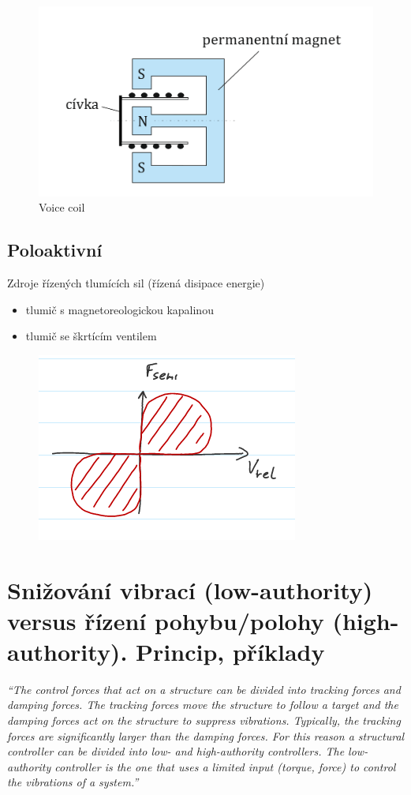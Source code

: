 \documentclass{article}
\begin{document}
	\begin{figure}[h!]
		\centering
		\includegraphics[width=0.5\linewidth]{figs/VoiceCoil.png}
		\caption{Voice coil}
	\end{figure}

	\subsection{Poloaktivní}
	Zdroje řízených tlumících sil (řízená disipace energie)
	\begin{itemize}
	\item tlumič s magnetoreologickou kapalinou
	\item tlumič se škrtícím ventilem
	\end{itemize}

	\begin{figure}[h!]
		\centering
		\includegraphics{figs/PoloAktivniAktuator.png}
	\end{figure}

	\section{Snižování vibrací (low-authority) versus řízení pohybu/polohy (high-authority). Princip, příklady}
	
	\emph{``The control forces that act on a structure can be divided into tracking forces and damping forces. The tracking forces move the structure to follow a target and the damping forces act on the structure to suppress vibrations. Typically, the tracking forces are significantly larger than the damping forces. For this reason a structural controller can be divided into low- and high-authority controllers. The low-authority controller is the one that uses a limited input (torque, force) to control the vibrations of a system.''}
\end{document}
